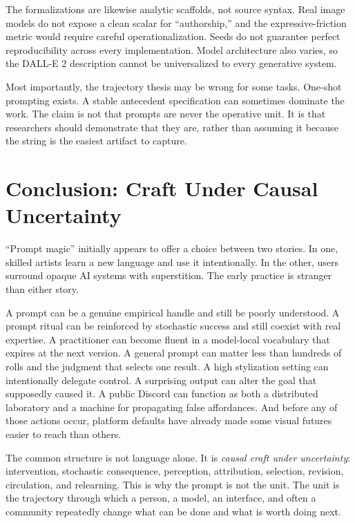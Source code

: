 \documentclass[11pt]{article}
\begin{document}
The formalizations are likewise analytic scaffolds, not source syntax. Real image models do not expose a clean scalar for ``authorship,'' and the expressive-friction metric would require careful operationalization. Seeds do not guarantee perfect reproducibility across every implementation. Model architecture also varies, so the DALL-E 2 description cannot be universalized to every generative system.

Most importantly, the trajectory thesis may be wrong for some tasks. One-shot prompting exists. A stable antecedent specification can sometimes dominate the work. The claim is not that prompts are never the operative unit. It is that researchers should demonstrate that they are, rather than assuming it because the string is the easiest artifact to capture.

\section{Conclusion: Craft Under Causal Uncertainty}

``Prompt magic'' initially appears to offer a choice between two stories. In one, skilled artists learn a new language and use it intentionally. In the other, users surround opaque AI systems with superstition. The early practice is stranger than either story.

A prompt can be a genuine empirical handle and still be poorly understood. A prompt ritual can be reinforced by stochastic success and still coexist with real expertise. A practitioner can become fluent in a model-local vocabulary that expires at the next version. A general prompt can matter less than hundreds of rolls and the judgment that selects one result. A high stylization setting can intentionally delegate control. A surprising output can alter the goal that supposedly caused it. A public Discord can function as both a distributed laboratory and a machine for propagating false affordances. And before any of those actions occur, platform defaults have already made some visual futures easier to reach than others.

The common structure is not language alone. It is \emph{causal craft under uncertainty}: intervention, stochastic consequence, perception, attribution, selection, revision, circulation, and relearning. This is why the prompt is not the unit. The unit is the trajectory through which a person, a model, an interface, and often a community repeatedly change what can be done and what is worth doing next.
\end{document}
